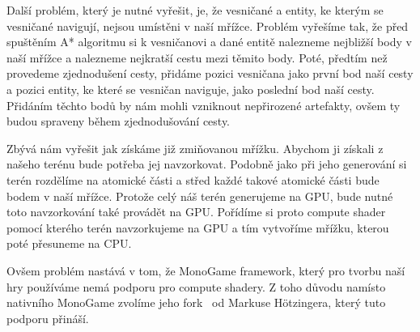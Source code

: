 Další problém, který je nutné vyřešit, je, že vesničané a entity, ke kterým se vesničané navigují, nejsou umístěni v naší mřížce. Problém vyřešíme tak, že před spuštěním A* algoritmu si k vesničanovi a dané entitě nalezneme nejbližší body v naší mřížce a nalezneme nejkratší cestu mezi těmito body. Poté, předtím než provedeme zjednodušení cesty, přidáme pozici vesničana jako první bod naší cesty a pozici entity, ke které se vesničan naviguje, jako poslední bod naší cesty. Přidáním těchto bodů by nám mohli vzniknout nepřirozené artefakty, ovšem ty budou spraveny během zjednodušování cesty.

Zbývá nám vyřešit jak získáme již zmiňovanou mřížku. Abychom ji získali z našeho terénu bude potřeba jej navzorkovat. Podobně jako při jeho generování si terén rozdělíme na atomické části a střed každé takové atomické části bude bodem v naší mřížce. Protože celý náš terén generujeme na GPU, bude nutné toto navzorkování také provádět na GPU. Pořídíme si proto compute shader pomocí kterého terén navzorkujeme na GPU a tím vytvoříme mřížku, kterou poté přesuneme na CPU.

Ovšem problém nastává v tom, že MonoGame framework, který pro tvorbu naší hry používáme nemá podporu pro compute shadery. Z toho důvodu namísto nativního MonoGame zvolíme jeho fork~\cite{MonoGameCptMax} od Markuse Hötzingera, který tuto podporu přináší.


















